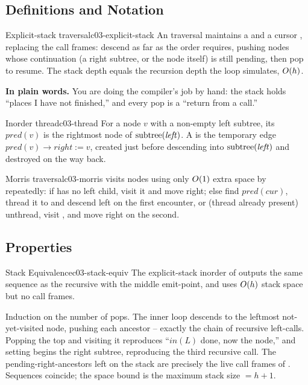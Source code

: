 \subsection{Definitions and Notation}

\begin{definition}{Explicit-stack traversal}{c03-explicit-stack}
An  traversal maintains a  and a cursor
, replacing the call frames: descend as far as the order requires, pushing
nodes whose continuation (a right subtree, or the node itself) is still pending, then pop
to resume. The stack depth equals the recursion depth the loop simulates, $O(h)$.
\end{definition}

\noindent\textbf{In plain words.} You are doing the compiler's job by hand: the stack
holds ``places I have not finished,'' and every pop is a ``return from a call.''

\begin{definition}{Inorder thread}{c03-thread}
For a node $v$ with a non-empty left subtree, its 
$\mathit{pred}(v)$ is the rightmost node of $\operatorname{subtree}(\mathit{left})$. A  is
the temporary edge $\mathit{pred}(v)\to\mathit{right} := v$, created just before
descending into $\operatorname{subtree}(\mathit{left})$ and destroyed on the way back.
\end{definition}

\begin{definition}{Morris traversal}{c03-morris}
 visits nodes using only $O(1)$ extra space by repeatedly:
if  has no left child, visit it and move right; else find $\mathit{pred}(\mathit{cur})$,
thread it to  and descend left on the first encounter, or (thread already
present) unthread, visit , and move right on the second.
\end{definition}

\subsection{Properties}

\begin{theorem}{Stack Equivalence}{c03-stack-equiv}
The explicit-stack inorder of  outputs the same sequence as
the recursive  with the middle emit-point, and uses $O(h)$ stack
space but no call frames.
\end{theorem}
\begin{proofbox}
Induction on the number of pops. The inner  loop
descends to the leftmost not-yet-visited node, pushing each ancestor -- exactly the chain
of recursive left-calls. Popping the top and visiting it reproduces ``$\mathit{in}(L)$
done, now the node,'' and setting  begins the right subtree,
reproducing the third recursive call. The pending-right-ancestors left on the stack are
precisely the live call frames of . Sequences coincide; the space bound
is the maximum stack size $=h+1$.
\end{proofbox}

